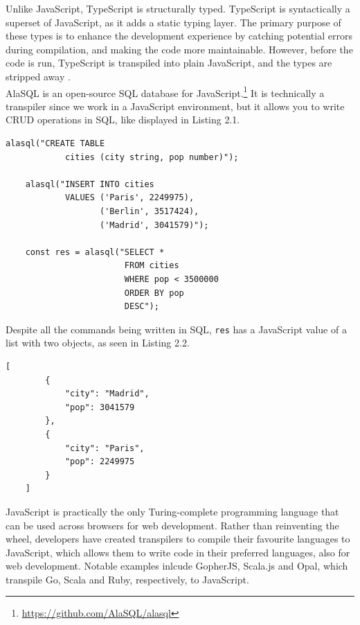 Unlike JavaScript, TypeScript is structurally typed. TypeScript is syntactically a superset of JavaScript, as it adds a static typing layer. The primary purpose of these types is to enhance the development experience by catching potential errors during compilation, and making the code more maintainable. However, before the code is run, TypeScript is transpiled into plain JavaScript, and the types are stripped away \cite{TypeScript}. \hfill \\

AlaSQL is an open-source SQL database for JavaScript.\footnote{\url{https://github.com/AlaSQL/alasql}} It is technically a transpiler since we work in a JavaScript environment, but it allows you to write CRUD operations in SQL, like displayed in Listing 2.1. \hfill \\

\begin{lstlisting}[caption={JavaScript code to create, populate and select a table with AlaSQL}, captionpos=b, frame=tlrb]
    alasql("CREATE TABLE
            cities (city string, pop number)");

    alasql("INSERT INTO cities
            VALUES ('Paris', 2249975),
                   ('Berlin', 3517424),
                   ('Madrid', 3041579)");

    const res = alasql("SELECT *
                        FROM cities
                        WHERE pop < 3500000
                        ORDER BY pop
                        DESC");
\end{lstlisting}

Despite all the commands being written in SQL, \texttt{res} has a JavaScript value of a list with two objects, as seen in Listing 2.2. \hfill \\

\begin{lstlisting}[caption={JSON list with two objects}, captionpos=b, frame=tlrb]
    [
        {
            "city": "Madrid",
            "pop": 3041579
        },
        {
            "city": "Paris",
            "pop": 2249975
        }
    ]
\end{lstlisting}

JavaScript is practically the only Turing-complete programming language that can be used across browsers for web development. Rather than reinventing the wheel, developers have created transpilers to compile their favourite languages to JavaScript, which allows them to write code in their preferred languages, also for web development. Notable examples inlcude GopherJS, Scala.js and Opal, which transpile Go, Scala and Ruby, respectively, to JavaScript. \hfill \\

